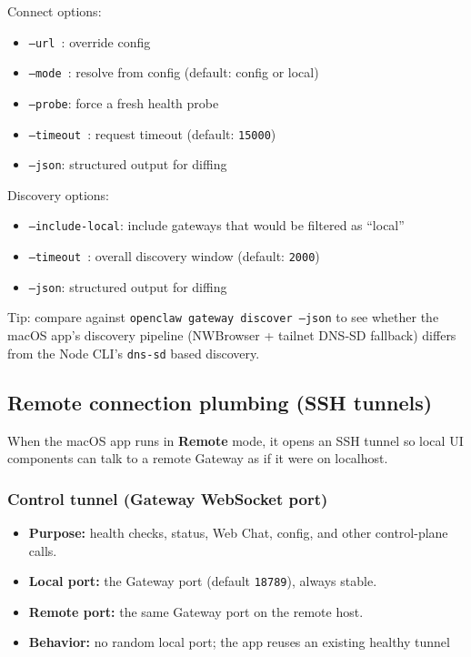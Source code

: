 Connect options:

\begin{itemize}
  \item \texttt{--url }: override config
  \item \texttt{--mode }: resolve from config (default: config or local)
  \item \texttt{--probe}: force a fresh health probe
  \item \texttt{--timeout }: request timeout (default: \texttt{15000})
  \item \texttt{--json}: structured output for diffing
\end{itemize}


Discovery options:

\begin{itemize}
  \item \texttt{--include-local}: include gateways that would be filtered as “local”
  \item \texttt{--timeout }: overall discovery window (default: \texttt{2000})
  \item \texttt{--json}: structured output for diffing
\end{itemize}


Tip: compare against \texttt{openclaw gateway discover --json} to see whether the
macOS app’s discovery pipeline (NWBrowser + tailnet DNS‑SD fallback) differs from
the Node CLI’s \texttt{dns-sd} based discovery.

\subsection{Remote connection plumbing (SSH tunnels)}


When the macOS app runs in \textbf{Remote} mode, it opens an SSH tunnel so local UI
components can talk to a remote Gateway as if it were on localhost.

\subsubsection{Control tunnel (Gateway WebSocket port)}


\begin{itemize}
  \item \textbf{Purpose:} health checks, status, Web Chat, config, and other control-plane calls.
  \item \textbf{Local port:} the Gateway port (default \texttt{18789}), always stable.
  \item \textbf{Remote port:} the same Gateway port on the remote host.
  \item \textbf{Behavior:} no random local port; the app reuses an existing healthy tunnel
\end{itemize}

